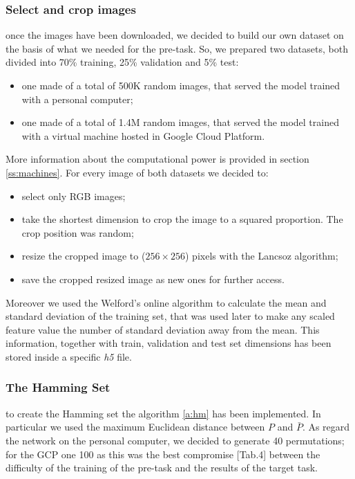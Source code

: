 \subsubsection{Select and crop images}\label{sss:select_crop_image}
once the images have been downloaded, we decided to build our own dataset on the basis of what we needed for the pre-task. So, we prepared two datasets, both divided into 70\% training, 25\% validation and 5\% test:
\begin{itemize}
    \item one made of a total of 500K random images, that served the model trained with a personal computer;
    \item one made of a total of 1.4M random images, that served the model trained with a virtual machine hosted in Google Cloud Platform.
\end{itemize}
More information about the computational power is provided in section \ref{ss:machines}. For every image of both datasets we decided to:
\begin{itemize}
    \item select only RGB images;
    \item take the shortest dimension to crop the image to a squared proportion. The crop position was random;
    \item resize the cropped image to ($256 \times 256$) pixels with the Lancsoz algorithm;
    \item save the cropped resized image as new ones for further access.
\end{itemize}
Moreover we used the Welford's online algorithm \cite{Welford_online_algorithm} to calculate the mean and standard deviation of the training set, that was used later to make any scaled feature value the number of standard deviation away from the mean. This information, together with train, validation and test set dimensions has been stored inside a specific \emph{h5} file.

\subsubsection{The Hamming Set}
to create the Hamming set the algorithm \ref{a:hm} has been implemented. In particular we used the maximum Euclidean distance between $P$ and $\bar{P}$. As regard the network on the personal computer, we decided to generate 40 permutations; for the GCP one 100 as this was the best compromise \cite{Noroozi_2016}[Tab.4] between the difficulty of the training of the pre-task and the results of the target task.


